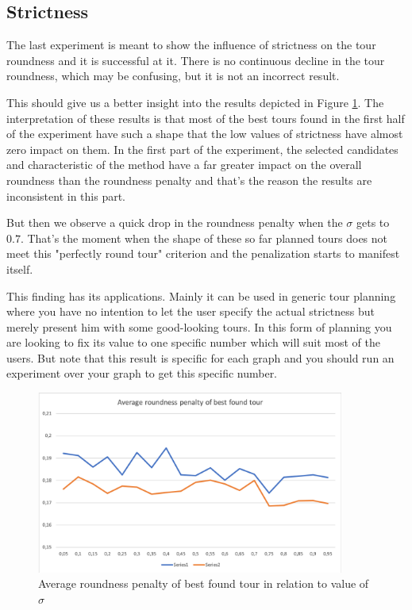 \documentclass{ctuthesis}
\begin{document}
\subsection{Strictness}
The last experiment is meant to show the influence of strictness on the tour roundness and it is successful at it. There is no continuous decline in the tour roundness, which may be confusing, but it is not an incorrect result.\par


This should give us a better insight into the results depicted in Figure \ref{fig:strictBest}. The interpretation of these results is that most of the best tours found in the first half of the experiment have such a shape that the low values of strictness have almost zero impact on them. In the first part of the experiment, the selected candidates and characteristic of the method have a far greater impact on the overall roundness than the roundness penalty and that's the reason the results are inconsistent in this part. \par
But then we observe a quick drop in the roundness penalty when the \(\sigma\) gets to \(0.7\). That's the moment when the shape of these so far planned tours does not meet this "perfectly round tour" criterion and the penalization starts to manifest itself. \par

This finding has its applications. Mainly it can be used in generic tour planning where you have no intention to let the user specify the actual strictness but merely present him with some good-looking tours. In this form of planning you are looking to fix its value to one specific number which will suit most of the users. But note that this result is specific for each graph and you should run an experiment over your graph to get this specific number.\par

\begin{figure}
	\includegraphics[width=0.9\textwidth]{strictBest.png}
	\caption{Average roundness penalty of best found tour in relation to value of \(\sigma\)}
	\label{fig:strictBest}
\end{figure}
\end{document}

